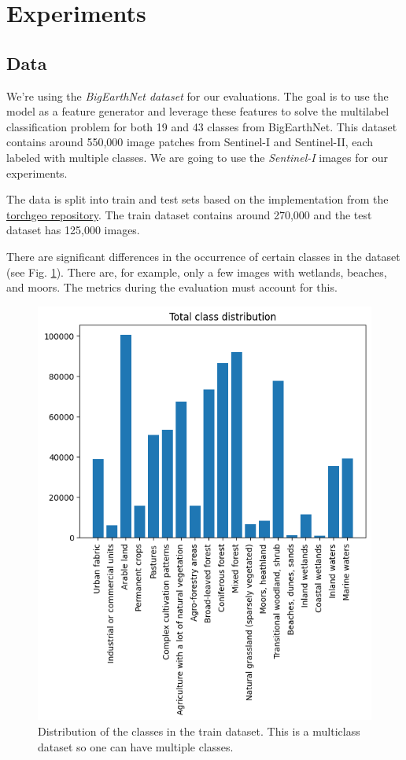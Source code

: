 \section{Experiments}

\subsection{Data}

We're using the \textit{BigEarthNet dataset} \cite{bigearthnet} for our evaluations. The goal is to use the model as a feature generator and leverage these features to solve the multilabel classification problem for both 19 and 43 classes from BigEarthNet. This dataset contains around 550,000 image patches from Sentinel-I and Sentinel-II, each labeled with multiple classes. We are going to use the \textit{Sentinel-I} images for our experiments.

The data is split into train and test sets based on the implementation from the \href{https://torchgeo.readthedocs.io/en/latest/api/datasets.html#bigearthnet}{torchgeo repository}. The train dataset contains around 270,000 and the test dataset has 125,000 images.

There are significant differences in the occurrence of certain classes in the dataset (see Fig. \ref{fig:class-distribution}). There are, for example, only a few images with wetlands, beaches, and moors. The metrics during the evaluation must account for this.

\begin{figure}[h]
  \centering
  \includegraphics[width=0.8\columnwidth]{images/class_distribution.png}
  \caption{Distribution of the classes in the train dataset. This is a multiclass dataset so one can have multiple classes.}
  \label{fig:class-distribution}
\end{figure}

